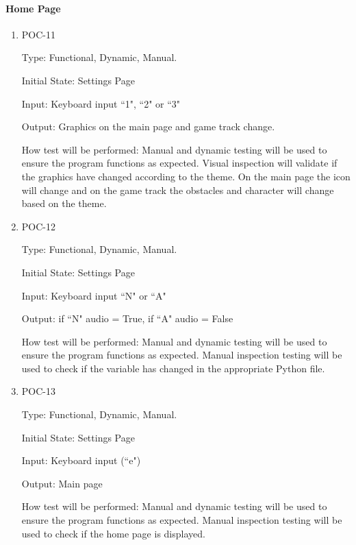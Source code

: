 \documentclass[12pt, titlepage]{article}
\begin{document}
		
\paragraph{Home Page}

\begin{enumerate}

\item{POC-11\\}

Type: Functional, Dynamic, Manual. 
					
Initial State: Settings Page
					
Input: Keyboard input ``1", ``2" or ``3" 
					
Output: Graphics on the main page and game track change. 
					
How test will be performed: Manual and dynamic testing will be used to ensure the program functions as expected. Visual inspection will validate if the graphics have changed according to the theme. On the main page the icon will change and on the game track the obstacles and character will change based on the theme. 
					
\item{POC-12\\}

Type: Functional, Dynamic, Manual.
					
Initial State: Settings Page
					
Input: Keyboard input ``N" or ``A" 
					
Output: if ``N" audio = True, if ``A" audio = False
					
How test will be performed: Manual and dynamic testing will be used to ensure the program functions as expected. Manual inspection testing will be used to check if the variable has changed in the appropriate Python file. 

\item{POC-13\\}

Type: Functional, Dynamic, Manual.
					
Initial State: Settings Page
					
Input: Keyboard input (``e")
					
Output: Main page
					
How test will be performed: Manual and dynamic testing will be used to ensure the program functions as expected. Manual inspection testing will be used to check if the home page is displayed. 

\end{enumerate}
\end{document}
